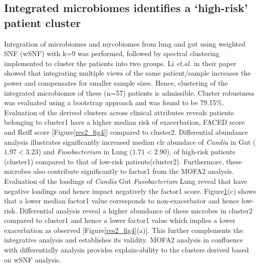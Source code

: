 \begin{figure}[h]
	\label{res2_fig3}
\end{figure}

\subsection{Integrated microbiomes identifies a `high-risk' patient cluster}
Integration of microbiomes and mycobiomes from lung and gut using weighted SNF (wSNF) with k=9 was performed, followed by spectral clustering implemented to cluster the patients into two groups. Li \emph{et.al.} in their paper showed that integrating multiple views of the same patient/sample increases the power and compensates for smaller sample sizes\cite{Li2018}. Hence, clustering of the integrated microbiomes of these (n=57) patients is admissible. Cluster robustness was evaluated using a bootstrap approach and was found to be 79.15\%. Evaluation of the derived clusters across clinical attributes reveals patients belonging to cluster1 have a higher median risk of exacerbation, FACED score and Reiff score [Figure\ref{res2_fig4}] compared to cluster2. Differential abundance analysis illustrates significantly increased median clr abundace of \emph{Candia} in Gut ($1.97<3.23$) and \emph{Fusobacterium} in Lung ($1.71<2.90$), of high-risk patients (cluster1) compared to that of low-risk patients(cluster2). Furthermore, these microbes also contribute significantly to factor1 from the MOFA2 analysis. Evaluation of the loadings of \emph{Candia} Gut \emph{Fusobacterium} Lung reveal that have negative loadings and hence impact negatively the factor1 score. Figure\ref{res2_fig3}(c) shows that a lower median factor1 value corresponds to non-exacerbator and hence low-risk. Differential analysis reveal a higher abundance of these microbes in cluster2 compared to cluster1 and hence a lower factor1 value which implies a lower exacerbation as observed [Figure\ref{res2_fig4}(a)]. This further complements the integrative analysis and establishes its validity. MOFA2 analysis in confluence with differentially analysis provides explain-ability to the clusters derived based on wSNF analysis.

